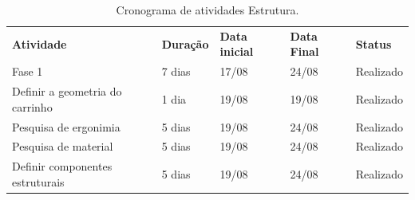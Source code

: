 \begin{table}[H]
 \centering
 {\renewcommand\arraystretch{1.25}
 \label{tab:cronestr}
 \caption{Cronograma de atividades Estrutura.}
 \begin{tabular}{ l l l l l }
  \cline{1-1}\cline{2-2}\cline{3-3}\cline{4-4}\cline{5-5}  
    \multicolumn{1}{|p{3.867cm}|}{\textbf{Atividade} \centering } &
    \multicolumn{1}{p{1.700cm}|}{\textbf{Duração} \centering } &
    \multicolumn{1}{p{1.133cm}|}{\textbf{Data inicial} \centering } &
    \multicolumn{1}{p{0.967cm}|}{\textbf{Data Final} \centering } &
    \multicolumn{1}{p{1.833cm}|}{\textbf{Status} \centering }
  \\  
  \cline{1-1}\cline{2-2}\cline{3-3}\cline{4-4}\cline{5-5}  
    \multicolumn{1}{|p{3.867cm}|}{Fase 1} &
    \multicolumn{1}{p{1.700cm}|}{7 dias \centering } &
    \multicolumn{1}{p{1.133cm}|}{17/08 \centering } &
    \multicolumn{1}{p{0.967cm}|}{24/08 \centering } &
    \multicolumn{1}{p{1.833cm}|}{Realizado \centering }
  \\  
  \cline{1-1}\cline{2-2}\cline{3-3}\cline{4-4}\cline{5-5}  
    \multicolumn{1}{|p{3.867cm}|}{Definir a geometria do carrinho} &
    \multicolumn{1}{p{1.700cm}|}{1 dia \centering } &
    \multicolumn{1}{p{1.133cm}|}{19/08 \centering } &
    \multicolumn{1}{p{0.967cm}|}{19/08 \centering } &
    \multicolumn{1}{p{1.833cm}|}{Realizado \centering }
  \\  
  \cline{1-1}\cline{2-2}\cline{3-3}\cline{4-4}\cline{5-5}  
    \multicolumn{1}{|p{3.867cm}|}{Pesquisa de ergonimia} &
    \multicolumn{1}{p{1.700cm}|}{5 dias \centering } &
    \multicolumn{1}{p{1.133cm}|}{19/08 \centering } &
    \multicolumn{1}{p{0.967cm}|}{24/08 \centering } &
    \multicolumn{1}{p{1.833cm}|}{Realizado \centering }
  \\  
  \cline{1-1}\cline{2-2}\cline{3-3}\cline{4-4}\cline{5-5}  
    \multicolumn{1}{|p{3.867cm}|}{Pesquisa de material } &
    \multicolumn{1}{p{1.700cm}|}{5 dias \centering } &
    \multicolumn{1}{p{1.133cm}|}{ 19/08 \centering } &
    \multicolumn{1}{p{0.967cm}|}{24/08 \centering } &
    \multicolumn{1}{p{1.833cm}|}{Realizado \centering }
  \\  
  \cline{1-1}\cline{2-2}\cline{3-3}\cline{4-4}\cline{5-5}  
    \multicolumn{1}{|p{3.867cm}|}{Definir componentes estruturais} &
    \multicolumn{1}{p{1.700cm}|}{5 dias \centering } &
    \multicolumn{1}{p{1.133cm}|}{19/08 \centering } &
    \multicolumn{1}{p{0.967cm}|}{24/08 \centering } &
    \multicolumn{1}{p{1.833cm}|}{Realizado \centering }

\end{tabular}}
\end{table}
